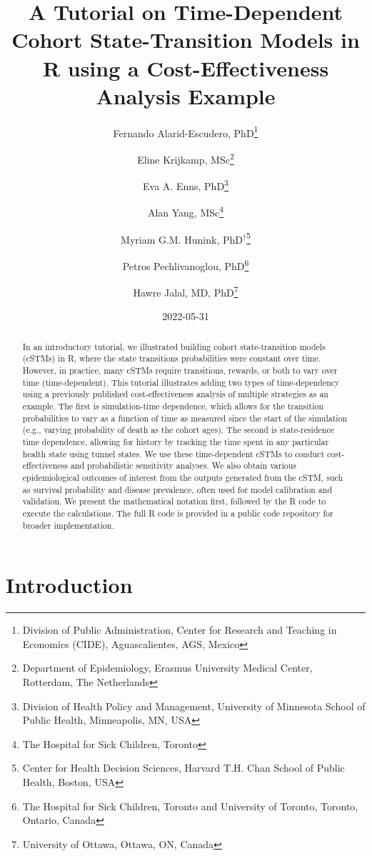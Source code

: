 \documentclass[
]{article}
\title{A Tutorial on Time-Dependent Cohort State-Transition Models in R using a Cost-Effectiveness Analysis Example}
\author{Fernando Alarid-Escudero, PhD\footnote{Division of Public Administration, Center for Research and Teaching in Economics (CIDE), Aguascalientes, AGS, Mexico} \and Eline Krijkamp, MSc\footnote{Department of Epidemiology, Erasmus University Medical Center, Rotterdam, The Netherlands} \and Eva A. Enns, PhD\footnote{Division of Health Policy and Management, University of Minnesota School of Public Health, Minneapolis, MN, USA} \and Alan Yang, MSc\footnote{The Hospital for Sick Children, Toronto} \and Myriam G.M. Hunink, PhD\(^\dagger\)\footnote{Center for Health Decision Sciences, Harvard T.H. Chan School of Public Health, Boston, USA} \and Petros Pechlivanoglou, PhD\footnote{The Hospital for Sick Children, Toronto and University of Toronto, Toronto, Ontario, Canada} \and Hawre Jalal, MD, PhD\footnote{University of Ottawa, Ottawa, ON, Canada}}
\date{2022-05-31}
\begin{document}
\maketitle
\begin{abstract}
In an introductory tutorial, we illustrated building cohort state-transition models (cSTMs) in R, where the state transitions probabilities were constant over time. However, in practice, many cSTMs require transitions, rewards, or both to vary over time (time-dependent). This tutorial illustrates adding two types of time-dependency using a previously published cost-effectiveness analysis of multiple strategies as an example. The first is simulation-time dependence, which allows for the transition probabilities to vary as a function of time as measured since the start of the simulation (e.g., varying probability of death as the cohort ages). The second is state-residence time dependence, allowing for history by tracking the time spent in any particular health state using tunnel states. We use these time-dependent cSTMs to conduct cost-effectiveness and probabilistic sensitivity analyses. We also obtain various epidemiological outcomes of interest from the outputs generated from the cSTM, such as survival probability and disease prevalence, often used for model calibration and validation. We present the mathematical notation first, followed by the R code to execute the calculations. The full R code is provided in a public code repository for broader implementation.
\end{abstract}

{
\setcounter{tocdepth}{2}
\tableofcontents
}
\hypertarget{introduction}{%
\section{Introduction}\label{introduction}}
\end{document}
